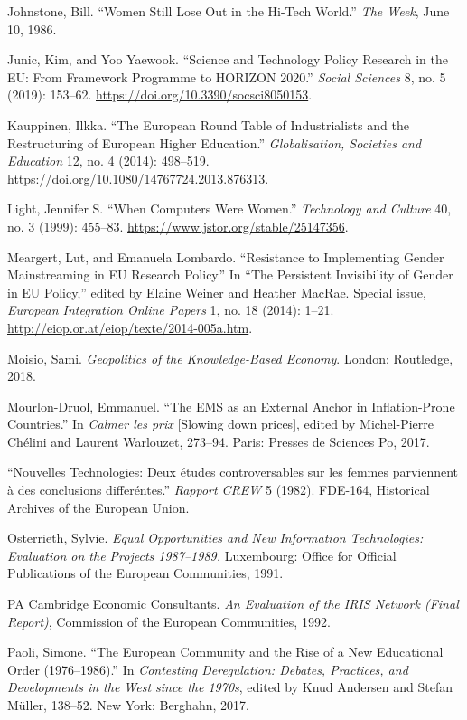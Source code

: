 \documentclass{tufte-handout}
\begin{document}
\begin{hangparas}{.25in}{1}
Johnstone, Bill. ``Women Still Lose Out in the Hi-Tech World.''
\emph{The Week}, June 10, 1986.

Junic, Kim, and Yoo Yaewook. ``Science and Technology Policy Research in
the EU: From Framework Programme to HORIZON 2020.'' \emph{Social
Sciences} 8, no. 5 (2019): 153--62.
\url{https://doi.org/10.3390/socsci8050153}.

Kauppinen, Ilkka. ``The European Round Table of Industrialists and the
Restructuring of European Higher Education.'' \emph{Globalisation,
Societies and Education} 12, no. 4 (2014): 498--519.
\url{https://doi.org/10.1080/14767724.2013.876313}.

Light, Jennifer S. ``When Computers Were Women.'' \emph{Technology and
Culture} 40, no. 3 (1999): 455--83.
\url{https://www.jstor.org/stable/25147356}.

Meargert, Lut, and Emanuela Lombardo. ``Resistance to Implementing
Gender Mainstreaming in EU Research Policy.'' In ``The Persistent
Invisibility of Gender in EU Policy,'' edited by Elaine Weiner and
Heather MacRae. Special issue, \emph{European Integration Online Papers}
1, no. 18 (2014): 1--21.
\url{http://eiop.or.at/eiop/texte/2014-005a.htm}.

Moisio, Sami. \emph{Geopolitics of the Knowledge-Based Economy}. London:
Routledge, 2018.

Mourlon-Druol, Emmanuel. ``The EMS as an External Anchor in
Inflation-Prone Countries.'' In \emph{Calmer les prix} {[}Slowing down
prices{]}, edited by Michel-Pierre Chélini and Laurent Warlouzet,
273--94. Paris: Presses de Sciences Po, 2017.

``Nouvelles Technologies: Deux études controversables sur les femmes
parviennent à des conclusions differéntes.'' \emph{Rapport CREW} 5
(1982). FDE-164, Historical Archives of the European Union.

Osterrieth, Sylvie. \emph{Equal Opportunities and New Information
Technologies: Evaluation on the Projects 1987--1989.} Luxembourg: Office
for Official Publications of the European Communities, 1991.

PA Cambridge Economic Consultants. \emph{An Evaluation of the IRIS
Network (Final Report)}, Commission of the European Communities, 1992.

Paoli, Simone. ``The European Community and the Rise of a New
Educational Order (1976--1986).'' In \emph{Contesting Deregulation:
Debates, Practices, and Developments in the West since the 1970s},
edited by Knud Andersen and Stefan Müller, 138--52. New York: Berghahn,
2017.


\end{hangparas}
\end{document}
